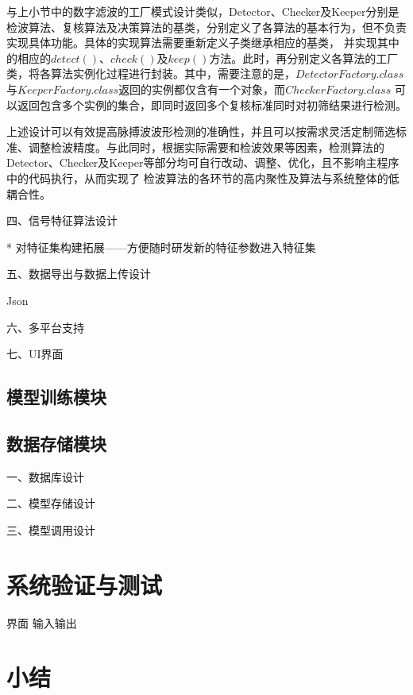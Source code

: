 与上小节中的数字滤波的工厂模式设计类似，Detector、Checker及Keeper分别是检波算法、复核算法及决策算法的基类，分别定义了各算法的基本行为，但不负责实现具体功能。具体的实现算法需要重新定义子类继承相应的基类，
并实现其中的相应的$detect()$、$check()$及$keep()$方法。此时，再分别定义各算法的工厂类，将各算法实例化过程进行封装。其中，需要注意的是，$DetectorFactory.class$与$KeeperFactory.class$返回的实例都仅含有一个对象，而$CheckerFactory.class$
可以返回包含多个实例的集合，即同时返回多个复核标准同时对初筛结果进行检测。

上述设计可以有效提高脉搏波波形检测的准确性，并且可以按需求灵活定制筛选标准、调整检波精度。与此同时，根据实际需要和检波效果等因素，检测算法的Detector、Checker及Keeper等部分均可自行改动、调整、优化，且不影响主程序中的代码执行，从而实现了
检波算法的各环节的高内聚性及算法与系统整体的低耦合性。

四、信号特征算法设计

* 对特征集构建拓展——方便随时研发新的特征参数进入特征集

五、数据导出与数据上传设计


Json

六、多平台支持


七、UI界面

\subsection{模型训练模块}
\subsection{数据存储模块}
一、数据库设计


二、模型存储设计

三、模型调用设计

\section{系统验证与测试}
界面
输入输出
\section{小结}